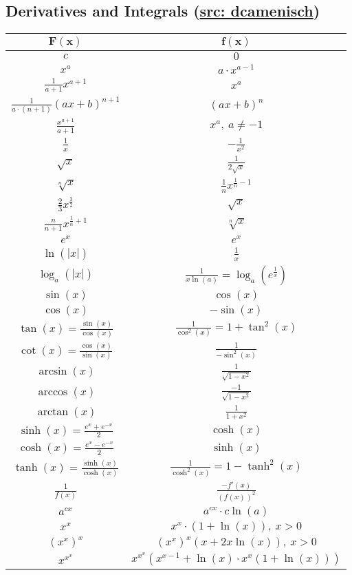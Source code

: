 \documentclass[a4paper, 10pt]{article}
\theoremstyle{definition}
\theoremstyle{ex}
\theoremstyle{named}
\begin{document}
\subsection*{Derivatives and Integrals (\href{https://n.ethz.ch/~dcamenisch/summaries/}{src: dcamenisch})}
\renewcommand{\arraystretch}{1.5}
\begin{center}
\begin{tabular}{c|c}
    $\mathbf{F(x)}$ & $\mathbf{f(x)}$ \\
    \midrule
    $c$ & $0$ \\
    $x^a$ & $a \cdot x^{a - 1}$ \\
    $\frac{1}{a+1} x^{a + 1}$ & $x^a$ \\
    $\frac{1}{a \cdot (n + 1)} (ax + b)^{n + 1}$ & $(ax + b)^n$ \\
    $\frac{x^{a + 1}}{a + 1}$ & $x^a, \ a \neq -1$ \\
    $\frac{1}{x}$ & $-\frac{1}{x^2}$ \\
    $\sqrt{x}$ & $\frac{1}{2\sqrt{x}}$ \\
    $\sqrt[n]{x}$ & $\frac{1}{n}x^{\frac{1}{n} - 1}$ \\
    $\frac{2}{3}x^{\frac{3}{2}}$ & $\sqrt{x}$ \\
    $\frac{n}{n+1} x^{\frac{1}{n} + 1}$ & $\sqrt[n]{x}$ \\
    $e^x$ & $e^x$ \\
    $\ln(|x|)$ & $\frac{1}{x}$ \\
    $\log_a(|x|)$ & $\frac{1}{x \ln(a)} = \log_a(e^\frac{1}{x})$ \\
    $\sin(x)$ & $\cos(x)$ \\
    $\cos(x)$ & $-\sin(x)$ \\
    $\tan(x) = \frac{\sin(x)}{\cos(x)}$ & $\frac{1}{\cos^2(x)} = 1 + \tan^2(x)$ \\
    $\cot(x) = \frac{\cos(x)}{\sin(x)}$ & $\frac{1}{-\sin^2(x)}$ \\
    $\arcsin(x)$ & $\frac{1}{\sqrt{1 - x^2}}$ \\
    $\arccos(x)$ & $\frac{-1}{\sqrt{1 - x^2}}$ \\
    $\arctan(x)$ & $\frac{1}{1 + x^2}$ \\
    $\sinh(x) = \frac{e^x + e^{-x}}{2}$ & $\cosh(x)$ \\
    $\cosh(x) = \frac{e^x - e^{-x}}{2}$ & $\sinh(x)$ \\
    $\tanh(x) = \frac{\sinh(x)}{\cosh(x)}$ & $\frac{1}{\cosh^2(x)} = 1 - \tanh^2(x)$ \\
    $\frac{1}{f(x)}$ & $\frac{-f'(x)}{(f(x))^2}$ \\
    $a^{cx}$ & $a^{cx} \cdot c \ln(a)$ \\
    $x^x$ & $x^x \cdot (1 + \ln(x)), \ x > 0$ \\
    $(x^x)^x$ & $(x^x)^x (x + 2x \ln(x)), \ x > 0$ \\
    $x^{x^x}$ & $x^{x^x} (x^{x - 1} + \ln(x) \cdot x^x (1 + \ln(x)))$ \\
\end{tabular}


\end{center}
\end{document}
